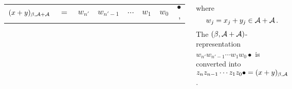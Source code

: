 \documentclass[25pt, a0paper, portrait, margin=0mm, innermargin=15mm, blockverticalspace=15mm, colspace=15mm, subcolspace=8mm]{tikzposter}
\begin{document}
\begin{columns}
{\begin{center}
\begin{tabular}{rccccccl}
	$(x+y)_{\beta,\mathcal{A}+\mathcal{A}}$& $=$& $w_{n'}$ & $w_{{n'}-1}$ & $\cdots$ & $w_1$ &$w_0$ &$\bullet$\,, %
	\end{tabular}	
	\end{center}
	  where
	  $$
	    w_j=x_j+y_j \in \mathcal{A} +\mathcal{A}\,.
	  $$
	  The $(\beta,\mathcal{A}+\mathcal{A})$-representation $w_{n'} w_{{n'}-1} \cdots w_1 w_0 \bullet$  is converted into $z_{n} z_{n-1}\cdots z_1 z_0 \bullet=(x+y)_{\beta,\mathcal{A}}$ .
	}

\end{columns}

\end{document}
